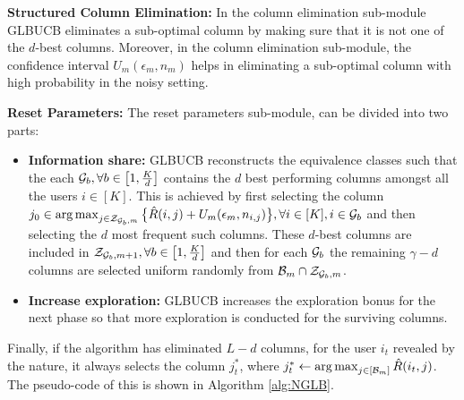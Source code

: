 \textbf{Structured Column Elimination:} In the column elimination sub-module GLBUCB eliminates a sub-optimal column by making sure that it is not one of the $d$-best columns. Moreover, in the column elimination sub-module, the confidence interval $U_m(\epsilon_m, n_m)$  helps in eliminating a sub-optimal column with high probability in the noisy setting. 

\textbf{Reset Parameters:} The reset parameters sub-module, can be divided into two parts: 
\begin{itemize}
\item\textbf{Information share:} GLBUCB reconstructs the equivalence classes such that the each $\mathcal{G}_b,\forall b\in\left[ 1, \frac{K}{d}\right]$ contains the $d$ best performing  columns amongst all the users $i\in[K]$. This is achieved by first selecting the  column $j_0\in \mathop{\rm arg\,max}_{j\in\mathcal{Z}_{\mathcal{G}_b,m}}\big\lbrace \hat{R}(i,j)  + U_m(\epsilon_m, n_{i,j})\big\rbrace, \forall i\in[K], i\in\mathcal{G}_b$ and then selecting the $d$ most frequent such columns. These $d$-best columns are included in $\mathcal{Z}_{\mathcal{G}_b,m+1}, \forall b\in\left[1,\frac{K}{d}\right]$ and then for each $\mathcal{G}_b$ the remaining $\gamma - d$ columns are selected uniform randomly from $\mathcal{B}_m \cap \mathcal{Z}_{\mathcal{G}_b,m}$.

\item\textbf{Increase exploration: } GLBUCB increases the exploration bonus for the next phase so that more exploration is conducted for the surviving columns. 

\end{itemize}

Finally, if the algorithm has eliminated $L-d$ columns, for the user $i_t$ revealed by the nature, it always selects the column $j^*_t$, where $j_t^* \leftarrow \mathop{\rm arg\,max}_{j\in[\mathcal{B}_m]} {\hat{R}(i_t,j)}$. The pseudo-code of this is shown in Algorithm \ref{alg:NGLB}. 




%

